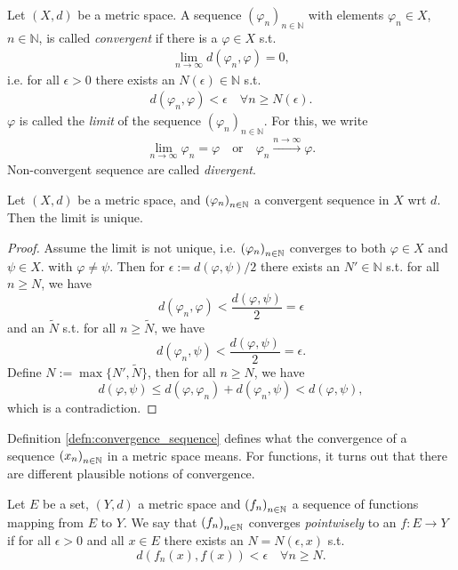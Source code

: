\begin{defn}\label{defn:convergence_sequence}
	Let $(X, d)$ be a metric space. A sequence $(\varphi_n)_{n\in\mathbb N}$ with elements $\varphi_n\in X$, $n\in\mathbb N$, is called \textit{convergent} if there is a $\varphi\in X$ s.t.
	\begin{align}
		\lim\limits_{n\to\infty}d(\varphi_n, \varphi) = 0,
	\end{align}
	i.e. for all $\epsilon > 0$ there exists an $N(\epsilon)\in\mathbb N$ s.t.
	\begin{align}
		d(\varphi_n, \varphi) < \epsilon \quad \forall n\geq N(\epsilon).
	\end{align}
	$\varphi$ is called the \textit{limit} of the sequence $(\varphi_n)_{n\in \mathbb N}$. For this, we write 
	\begin{align}
		\lim\limits_{n\to\infty}\varphi_n = \varphi \quad \text{or}\quad \varphi_n \overset{n \to\infty}{\longrightarrow} \varphi.
	\end{align}
	Non-convergent sequence are called \textit{divergent}.
\end{defn}

\begin{theorem}\label{thrm:sequences_unique_limits}
	Let $(X, d)$ be a metric space, and $\seq[\varphi_n]$ a convergent sequence in $X$ wrt $d$. Then the limit is unique.
\end{theorem}

\begin{proof}
	Assume the limit is not unique, i.e. $\seq[\varphi_n]$ converges to both $\varphi\in X$ and $\psi\in X$. with $\varphi\ne\psi$. Then for $\epsilon := d(\varphi, \psi) / 2$ there exists an $N'\in\mathbb N$ s.t. for all $n\geq N$, we have
	$$d(\varphi_n, \varphi) < \frac{d(\varphi, \psi)}{2} = \epsilon$$ 
	and an $\tilde{N}$ s.t. for all $n\geq \tilde{N}$, we have
	$$d(\varphi_n, \psi) < \frac{d(\varphi, \psi)}{2} = \epsilon.$$
	Define $N := \max\{N', \tilde{N}\}$, then for all $n\geq N$, we have
	$$d(\varphi, \psi) \leq d(\varphi, \varphi_n) + d(\varphi_n, \psi) < d(\varphi, \psi),$$
	which is a contradiction.
\end{proof}

Definition \ref{defn:convergence_sequence} defines what the convergence of a sequence $\seq[x_n]$ in a metric space means. For functions, it turns out that there are different plausible notions of convergence. 

\begin{defn}
	Let $E$ be a set, $(Y, d)$ a metric space and $\seq[f_n]$ a sequence of functions mapping from $E$ to $Y$. We say that $\seq[f_n]$ converges \textit{pointwisely} to an $f: E\to Y$ if for all $\epsilon > 0$ and all $x\in E$ there exists an $N = N(\epsilon, x)$ s.t. 
	\[
		d(f_n(x), f(x)) < \epsilon\quad\forall n\geq N.
	\] 
\end{defn}

